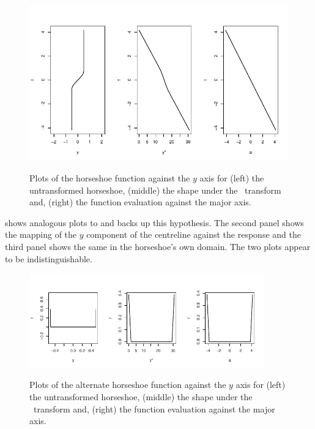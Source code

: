 \begin{figure}
\centering
\includegraphics[trim=0in 0in 0in 0in]{sc/figs/centrelinelineplots.pdf} \\
\caption{Plots of the horseshoe function against the $y$ axis for (left) the untransformed horseshoe, (middle) the shape under the \sch\ transform and, (right) the function evaluation against the major axis.}
\label{centrelinelineplot}
\end{figure}

 shows analogous plots to  and backs up this hypothesis. The second panel shows the mapping of the $y$ component of the centreline against the response and the third panel shows the same in the horseshoe's own domain. The two plots appear to be indistinguishable.

\begin{figure}
\centering
\includegraphics[width=4in]{sc/figs/altcentrelinelineplots.pdf} \\
\caption{Plots of the alternate horseshoe function against the $y$ axis for (left) the untransformed horseshoe, (middle) the shape under the \sch\ transform and, (right) the function evaluation against the major axis.}
\label{altcentrelinelineplot}
\end{figure}

